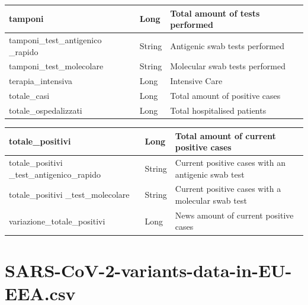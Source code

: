 \documentclass[a4paper,12pt]{article}
\begin{document}
\begin{center}
\begin{tabular}{|m{45mm}|>{\raggedright}m{16mm}|m{75mm}|}
\hline
tamponi & Long & Total amount of tests performed  \\
\hline
tamponi\_test\_antigenico \_rapido & String & Antigenic swab tests performed \\
\hline
tamponi\_test\_molecolare & String & Molecular swab tests performed \\
\hline
terapia\_intensiva & Long & Intensive Care \\
\hline
totale\_casi & Long & Total amount of positive cases \\
\hline
totale\_ospedalizzati & Long & Total hospitalised patients \\
\hline
\end{tabular}
\end{center}
\newpage
\begin{center}
\begin{tabular}{|m{45mm}|>{\raggedright}m{16mm}|m{75mm}|}
\hline
totale\_positivi & Long & Total amount of current positive cases \\
\hline
totale\_positivi  \_test\_antigenico\_rapido & String & Current positive cases with an antigenic swab test \\
\hline
totale\_positivi  \_test\_molecolare & String & Current positive cases with a molecular swab test \\
\hline
variazione\_totale\_positivi & Long & News amount of current positive cases \\
\hline
\end{tabular}
\end{center}
\newpage

\section{SARS-CoV-2-variants-data-in-EU-EEA.csv}
\end{document}
